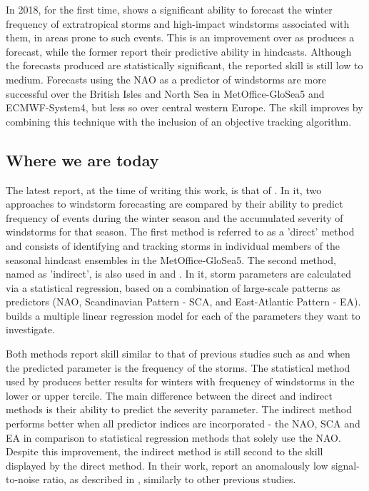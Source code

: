         In 2018, for the first time, \cite{Befort2018} shows a significant ability to forecast the winter frequency of extratropical storms and high-impact windstorms associated with them, in areas prone to such events. This is an improvement over \cite{Renggli2011} as \citeauthor{Befort2018} produces a forecast, while the former report their predictive ability in hindcasts. Although the forecasts produced are statistically significant, the reported skill is still low to medium. Forecasts using the NAO as a predictor of windstorms are more successful over the British Isles and North Sea in MetOffice-GloSea5 and ECMWF-System4, but less so over central western Europe. The skill improves by combining this technique with the inclusion of an objective tracking algorithm.
    

    
    \subsection{Where we are today}

        The latest report, at the time of writing this work, is that of \cite{Degenhardt2023}. In it, two approaches to windstorm forecasting are compared by their ability to predict frequency of events during the winter season and the accumulated severity of windstorms for that season. The first method is referred to as a 'direct' method and consists of identifying and tracking storms in individual members of the seasonal hindcast ensembles in the MetOffice-GloSea5.
        The second method, named as 'indirect', is also used in \cite{Befort2018} and \cite{Scaifehttps://doi.org/10.1002/2014GL059637}. In it, storm parameters are calculated via a statistical regression, based on a combination of large-scale patterns as predictors (NAO, Scandinavian Pattern - SCA, and East-Atlantic Pattern - EA). \citeauthor{Degenhardt2023} builds a multiple linear regression model for each of the parameters they want to investigate.

        Both methods report skill similar to that of previous studies such as \cite{Befort2018} and \cite{Scaifehttps://doi.org/10.1002/2014GL059637} when the predicted parameter is the frequency of the storms. The statistical method used by \cite{Renggli2011} produces better results for winters with frequency of windstorms in the lower or upper tercile. The main difference between the direct and indirect methods is their ability to predict the severity parameter. The indirect method performs better when all predictor indices are incorporated - the NAO, SCA and EA in comparison to statistical regression methods that solely use the NAO. Despite this improvement, the indirect method is still second to the skill displayed by the direct method. In their work, \citeauthor{Degenhardt2023} report an anomalously low signal-to-noise ratio, as described in \cite{Scaife2018}, similarly to other previous studies.

